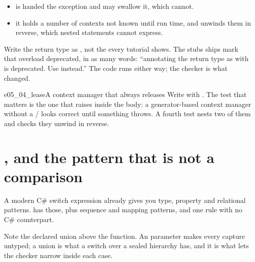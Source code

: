 \begin{itemize}[leftmargin=1.4em, itemsep=2pt]
  \item {} \dash{}  is handed the exception
        and may swallow it, which  cannot.
  \item {} \dash{} it holds a number of contexts not known
        until run time, and unwinds them in reverse, which nested
         statements cannot express.
\end{itemize}


\begin{versionbox}
Write the return type as , not the
 every tutorial shows. The stubs 
\pyrightver{} ships mark that overload deprecated, in as many words:
\enquote{annotating the return type as  with
 is deprecated. Use 
instead.} The code runs either way; the checker is what changed.
\end{versionbox}

\begin{exercise}{e05_04_lease}{A context manager that always releases}
Write  with . The test that
matters is the one that raises inside the body: a generator-based context
manager without a / looks correct until something
throws. A fourth test nests two of them and checks they unwind in reverse.
\end{exercise}

\section{, and the pattern that is not a comparison}
\label{sec:ch05-match}

A modern C\# switch expression already gives you type, property and
relational patterns.  has those, plus sequence and mapping
patterns, and one rule with no C\# counterpart.



\noindent
Note the declared union above the function. An  parameter
makes every capture untyped; a union is what a switch over a sealed
hierarchy has, and it is what lets the checker narrow inside each case.

